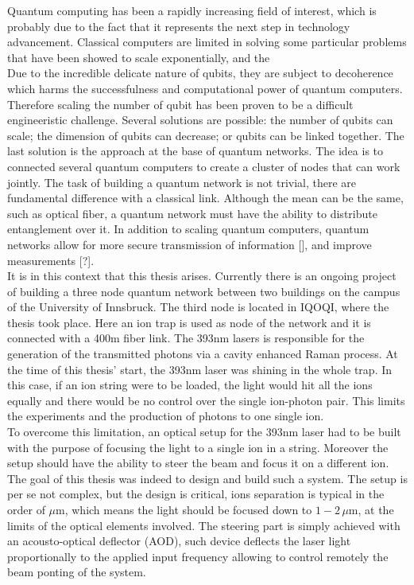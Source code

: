 \documentclass[english, a4paper, 12pt, twoside]{book}
\numberwithin{equation}{section} %
\begin{document}
Quantum computing has been a rapidly increasing field of interest, which is probably due to the fact that it represents the
next step in technology advancement. Classical computers are limited in solving some particular problems that have been showed to scale exponentially, and the
\\
Due to the incredible delicate nature of qubits, they are subject to decoherence which harms the successfulness and computational power of quantum computers. Therefore scaling the number of qubit has been proven to be a difficult engineeristic challenge. Several solutions are possible: the number of qubits can scale; the dimension of qubits can decrease; or qubits can be linked together. The last solution is the approach at the base of quantum networks. The idea is to connected several quantum computers to create a cluster of nodes that can work jointly. The task of building a quantum network is not trivial, there are fundamental difference with a classical link. Although the mean can be the same, such as optical fiber, a quantum network must have the ability to distribute entanglement over it. In addition to scaling quantum computers, quantum networks allow for more secure transmission of information [], and improve measurements [?].\\
It is in this context that this thesis arises. Currently there is an ongoing project of building a three node quantum network between two buildings on the campus of the University of Innsbruck. The third node is located in IQOQI, where the thesis took place. Here an ion trap is used as node of the network and it is connected with a 400m fiber link. The 393nm lasers is responsible for the generation of the transmitted photons via a cavity enhanced Raman process. At the time of this thesis' start, the 393nm laser was shining in the whole trap. In this case, if an ion string were to be loaded, the light would hit all the ions equally and there would be no control over the single ion-photon pair. This limits the experiments and the production of photons to one single ion.\\
To overcome this limitation, an optical setup for the 393nm laser had to be built with the purpose of focusing the light to a single ion in a string. Moreover the setup should have the ability to steer the beam and focus it on a different ion. The goal of this thesis was indeed to design and build such a system. The setup is per se not complex, but the design is critical, ions separation is typical in the order of $\mu$m, which means the light should be focused down to $1-2\,\mu$m, at the limits of the optical elements involved. The steering part is simply achieved with an acousto-optical deflector (AOD), such device deflects the laser light proportionally to the applied input frequency allowing to control remotely the beam ponting of the system.\\
\end{document}
